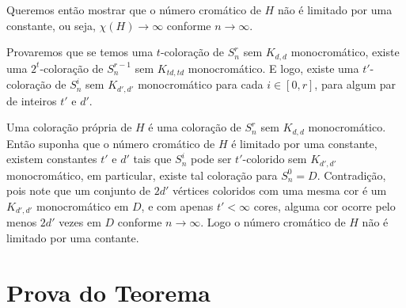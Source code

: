 Queremos então mostrar que o número cromático de $H$ não é limitado por uma constante, ou seja, $\chi(H) \rightarrow \infty$ conforme $n \rightarrow \infty$.

Provaremos que se temos uma $t$-coloração de $S_n^r$ sem $K_{d,d}$ monocromático, existe uma $2^t$-coloração de $S_n^{r-1}$ sem $K_{td,td}$ monocromático. E logo, existe uma $t'$-coloração de $S_n^i$ sem $K_{d',d'}$ monocromático para cada $i\in [0,r]$, para algum par de inteiros $t'$ e $d'$.

Uma coloração própria de $H$ é uma coloração de $S_n^r$ sem $K_{d,d}$ monocromático. Então suponha que o número cromático de $H$ é limitado por uma constante, existem constantes $t'$ e $d'$ tais que $S_n^i$ pode ser $t'$-colorido sem $K_{d',d'}$ monocromático, em particular, existe tal coloração para $S_n^0 = D$. Contradição, pois note que um conjunto de $2d'$ vértices coloridos com uma mesma cor é um $K_{d',d'}$ monocromático em $D$, e com apenas $t' < \infty$ cores, alguma cor ocorre pelo menos $2d'$ vezes em $D$ conforme $n\rightarrow\infty$. Logo o número cromático de $H$ não é limitado por uma contante.

\section{Prova do Teorema}






